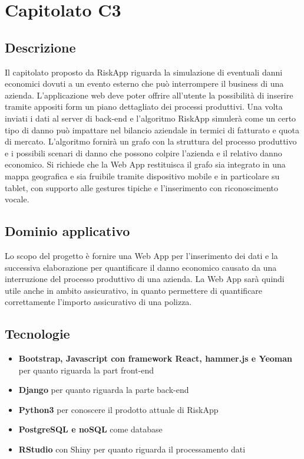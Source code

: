 \newpage
\section{Capitolato C3}

\subsection{Descrizione}

Il capitolato proposto da RiskApp riguarda la simulazione di eventuali danni economici dovuti a un evento esterno che può interrompere il business di una azienda. L’applicazione web deve poter offrire all’utente la possibilità di inserire tramite appositi form un piano dettagliato dei processi produttivi. Una volta inviati i dati al server di back-end e l'algoritmo RiskApp simulerà come un certo tipo di danno può impattare nel bilancio aziendale in termici di fatturato e quota di mercato. L’algoritmo fornirà un grafo con la struttura del processo produttivo e i possibili scenari di danno che possono colpire l’azienda e il relativo danno economico. Si richiede che la Web App restituisca il grafo sia integrato in una mappa geografica e sia fruibile tramite dispositivo mobile e in particolare su tablet, con supporto alle gestures tipiche e l'inserimento con riconoscimento vocale.

\subsection{Dominio applicativo}

Lo scopo del progetto è fornire una Web App per l'inserimento dei dati e la successiva elaborazione per quantificare il danno economico causato da una interruzione del processo produttivo di una azienda. La Web App sarà quindi utile anche in ambito assicurativo, in quanto permettere di quantificare correttamente l'importo assicurativo di una polizza.

\subsection{Tecnologie}
\begin{itemize}
	\item \textbf{Bootstrap, Javascript con framework React, hammer.js e Yeoman}
	per quanto riguarda la part front-end
	\item \textbf{Django} per quanto riguarda la parte back-end
	\item \textbf{Python3} per conoscere il prodotto attuale di RiskApp
	\item \textbf{PostgreSQL e noSQL} come database
	\item \textbf{RStudio} con Shiny per quanto riguarda il processamento dati
\end{itemize}

